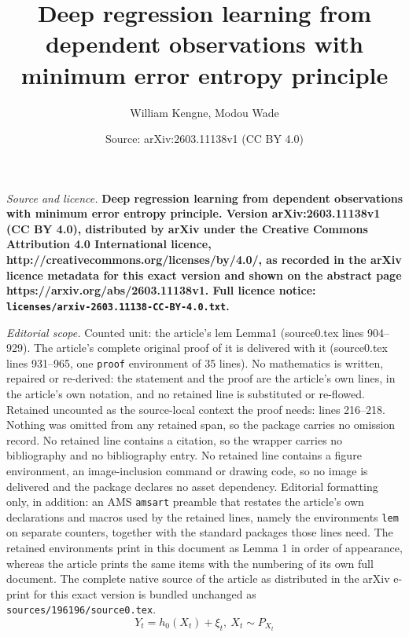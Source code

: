 \documentclass[10pt,a4paper]{amsart}
\title{\bf Deep regression learning from dependent observations with minimum error entropy principle}
\author{William Kengne, Modou Wade}
\date{Source: arXiv:2603.11138v1 (CC BY 4.0)}
\begin{document}
\maketitle

\noindent\emph{Source and licence.} \bf Deep regression learning from dependent observations with minimum error entropy principle. Version arXiv:2603.11138v1 (CC BY 4.0), distributed by arXiv under the Creative Commons Attribution 4.0 International licence, http://creativecommons.org/licenses/by/4.0/, as recorded in the arXiv licence metadata for this exact version and shown on the abstract page https://arxiv.org/abs/2603.11138v1. Full licence notice: \texttt{licenses/arxiv-2603.11138-CC-BY-4.0.txt}.\par\smallskip

\noindent\textit{Editorial scope.} Counted unit: the article's lem Lemma1 (source0.tex lines 904--929). The article's complete original proof of it is delivered with it (source0.tex lines 931--965, one \texttt{proof} environment of 35 lines). No mathematics is written, repaired or re-derived: the statement and the proof are the article's own lines, in the article's own notation, and no retained line is substituted or re-flowed.  Retained uncounted as the source-local context the proof needs: lines 216--218.  Nothing was omitted from any retained span, so the package carries no omission record.  No retained line contains a citation, so the wrapper carries no bibliography and no bibliography entry.  No retained line contains a figure environment, an image-inclusion command or drawing code, so no image is delivered and the package declares no asset dependency.  Editorial formatting only, in addition: an AMS \texttt{amsart} preamble that restates the article's own declarations and macros used by the retained lines, namely the environments \texttt{lem} on separate counters, together with the standard packages those lines need.  The retained environments print in this document as Lemma 1 in order of appearance, whereas the article prints the same items with the numbering of its own full document.  The complete native source of the article as distributed in the arXiv e-print for this exact version is bundled unchanged as \texttt{sources/196196/source0.tex}.
\begin{equation}\label{equa_model_reg}
Y_t = h_0(X_t) + \xi_t, ~ X_t \sim P_{X_t}
\end{equation}
\end{document}
